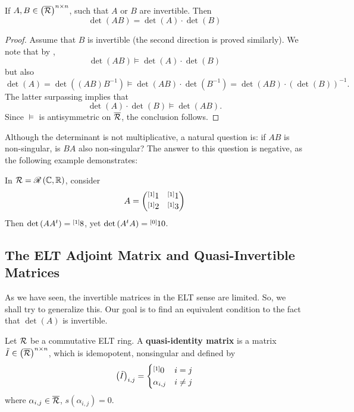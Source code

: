 \begin{thm}\label{thm:det-is-mult-invert-mat}
If $A,B\in \left(\overline{\R}\right)^{n\times n}$, such that $A$ or $B$ are invertible. Then
$$\det\left(AB\right)=\det\left(A\right)\cdot\det\left(B\right)$$
\end{thm}
\begin{proof}
Assume that $B$ is invertible (the second direction is proved similarly). We note that by ,
$$\det\left(AB\right)\vDash\det\left(A\right)\cdot\det\left(B\right)$$
but also
$$\det\left(A\right)=\det\left(\left(AB\right)B^{-1}\right)\vDash\det\left(AB\right)\cdot\det \left(B^{-1}\right)=\det\left(AB\right)\cdot\left(\det\left(B\right)\right)^{-1}.$$
The latter surpassing implies that
$$\det\left(A\right)\cdot\det\left(B\right)\vDash\det\left(AB\right).$$
Since $\vDash$ is antisymmetric on $\overline{\R}$, the conclusion follows.
\end{proof}

Although the determinant is not multiplicative, a natural question is: if $AB$ is non-singular, is $BA$ also non-singular? The answer to this question is negative, as the following example demonstrates:
\begin{example}
In $\R=\ELT{\mathbb{R}}{\mathbb{C}}$, consider
$$A=\begin{pmatrix}\layer{1}{1} & \layer{1}{1}\\
\layer{2}{1} & \layer{3}{1}
\end{pmatrix}$$
Then $\det\left(AA^{t}\right)=\layer{8}{1}$, yet $\det\left(A^{t}A\right)=\layer{10}{0}$.
\end{example}

\subsection{The ELT Adjoint Matrix and Quasi-Invertible Matrices}
As we have seen, the invertible matrices in the ELT sense are limited. So, we shall try to generalize this. Our goal is to find an equivalent condition to the fact that $\det\left(A\right)$ is invertible.

\begin{defn}
Let $\R$ be a commutative ELT ring. A \textbf{quasi-identity matrix} is a matrix $\tilde{I}\in \left(\overline{\R}\right)^{n\times n}$, which is idemopotent, nonsingular and defined by
$$\left(\tilde{I}\right)_{i,j}=\begin{cases}
\one & i=j\\
\alpha_{i,j} & i\neq j
\end{cases}$$
where $\alpha_{i,j}\in\overline{\R}$, $s\left(\alpha_{i,j}\right)=0$.
\end{defn}

